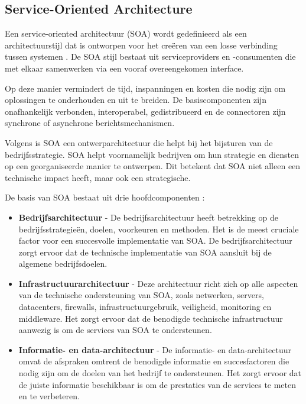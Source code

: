\subsection{Service-Oriented Architecture}
\label{sec:SOA_architectuur}

Een service-oriented architectuur (SOA) wordt gedefinieerd als een architectuurstijl dat is ontworpen voor het creëren van een losse verbinding tussen systemen \autocite{Rojas2021}. De SOA stijl bestaat uit serviceproviders en -consumenten die met elkaar samenwerken via een vooraf overeengekomen interface. 

Op deze manier vermindert de tijd, inspanningen en kosten die nodig zijn om oplossingen te onderhouden en uit te breiden. De basiscomponenten zijn onafhankelijk verbonden, interoperabel, gedistribueerd en de connectoren zijn synchrone of asynchrone berichtsmechanismen.\newline

Volgens \textcite{Muhardany2020} is SOA een ontwerparchitectuur die helpt bij het bijsturen van de bedrijfsstrategie. SOA helpt voornamelijk bedrijven om hun strategie en diensten op een georganiseerde manier te ontwerpen. Dit betekent dat SOA niet alleen een technische impact heeft, maar ook een strategische.

De basis van SOA bestaat uit drie hoofdcomponenten \autocite{Muhardany2020}:

\begin{itemize}
	\item \textbf{Bedrijfsarchitectuur} - De bedrijfsarchitectuur heeft betrekking op de bedrijfsstrategieën, doelen, voorkeuren en methoden. Het is de meest cruciale factor voor een succesvolle implementatie van SOA. De bedrijfsarchitectuur zorgt ervoor dat de technische implementatie van SOA aansluit bij de algemene bedrijfsdoelen.
	\item \textbf{Infrastructuurarchitectuur} - Deze architectuur richt zich op alle aspecten van de technische ondersteuning van SOA, zoals netwerken, servers, datacenters, firewalls, infrastructuurgebruik, veiligheid, monitoring en middleware. Het zorgt ervoor dat de benodigde technische infrastructuur aanwezig is om de services van SOA te ondersteunen.
	\item \textbf{Informatie- en data-architectuur} - De informatie- en data-architectuur omvat de afspraken omtrent de benodigde informatie en succesfactoren die nodig zijn om de doelen van het bedrijf te ondersteunen. Het zorgt ervoor dat de juiste informatie beschikbaar is om de prestaties van de services te meten en te verbeteren.
\end{itemize}

